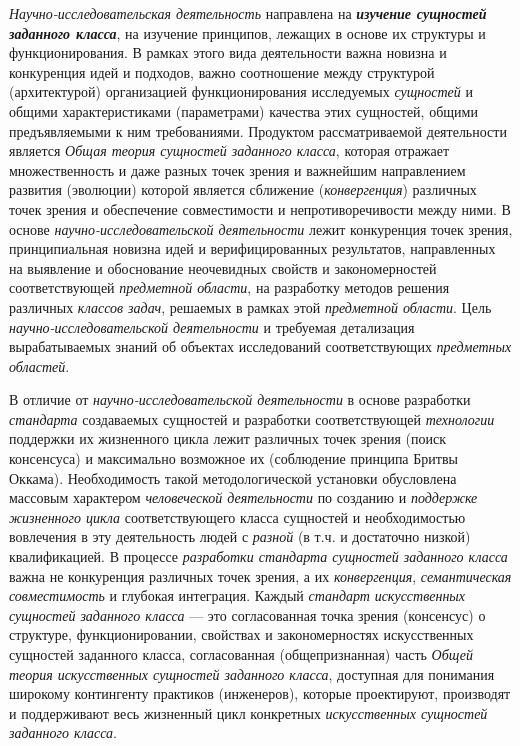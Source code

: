 \textit{Научно-исследовательская деятельность} направлена на \textbf{\textit{изучение сущностей заданного класса}}, на изучение принципов, лежащих в основе их структуры и функционирования. В рамках этого вида деятельности важна новизна и конкуренция идей и подходов, важно соотношение между структурой (архитектурой) организацией функционирования исследуемых \textit{сущностей} и общими характеристиками (параметрами) качества этих сущностей, общими предъявляемыми к ним требованиями. Продуктом рассматриваемой деятельности является \textit{Общая теория сущностей заданного класса}, которая отражает множественность и даже  разных точек зрения и важнейшим направлением развития (эволюции) которой является сближение (\textit{конвергенция}) различных точек зрения и обеспечение совместимости и непротиворечивости между ними. В основе \textit{научно-исследовательской деятельности} лежит конкуренция точек зрения, принципиальная новизна идей и верифицированных результатов, направленных на выявление и обоснование неочевидных свойств и закономерностей соответствующей \textit{предметной области}, на разработку методов решения различных \textit{классов задач}, решаемых в рамках этой \textit{предметной области}. Цель \textit{научно-исследовательской деятельности} и требуемая детализация вырабатываемых знаний об объектах исследований соответствующих \textit{предметных областей}.

В отличие от \textit{научно-исследовательской деятельности} в основе разработки \textit{стандарта} создаваемых сущностей и разработки соответствующей \textit{технологии} поддержки их жизненного цикла лежит  различных точек зрения (поиск консенсуса) и максимально возможное их  (соблюдение принципа Бритвы Оккама). Необходимость такой методологической установки обусловлена массовым характером \textit{человеческой деятельности} по созданию и \textit{поддержке жизненного цикла} соответствующего класса сущностей и необходимостью вовлечения в эту деятельность людей с \textit{разной} (в т.ч. и достаточно низкой) квалификацией. В процессе \textit{разработки стандарта сущностей заданного класса} важна не конкуренция различных точек зрения, а их \textit{конвергенция}, \textit{семантическая совместимость} и глубокая интеграция. Каждый \textit{стандарт} \textit{искусственных сущностей заданного класса} --- это согласованная  точка зрения (консенсус) о структуре, функционировании, свойствах и закономерностях искусственных сущностей заданного класса, согласованная (общепризнанная) часть \textit{Общей теория искусственных сущностей заданного класса}, доступная для понимания широкому контингенту практиков (инженеров), которые проектируют, производят и поддерживают весь жизненный цикл конкретных \textit{искусственных сущностей заданного класса}.

